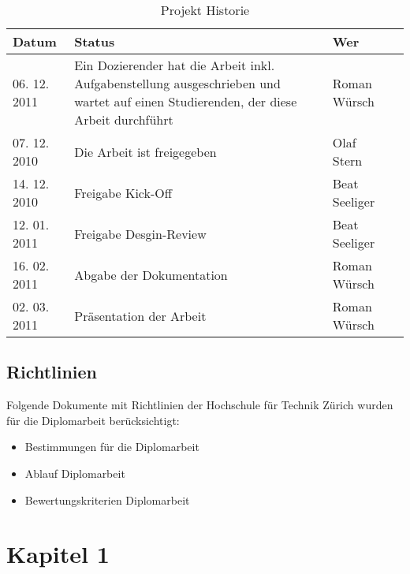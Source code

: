 \documentclass[abstracton, listof=totocnumbered,
bibliography=totocnumbered]{scrreprt}
\begin{document}
  \begin{table}[h]
    \begin{center}
      \begin{tabular}{lp{9cm}ll}
        \toprule
        Datum & Status & Wer \\
        \midrule
        06. 12. 2011 & Ein Dozierender hat die Arbeit inkl. Aufgabenstellung
        ausgeschrieben und wartet auf einen Studierenden, der diese Arbeit
        durchführt & Roman Würsch\\
        07. 12. 2010 & Die Arbeit ist freigegeben & Olaf Stern\\
        14. 12. 2010 & Freigabe Kick-Off & Beat Seeliger\\
        12. 01. 2011 & Freigabe Desgin-Review & Beat Seeliger\\
        16. 02. 2011 & Abgabe der Dokumentation & Roman Würsch\\
        02. 03. 2011 & Präsentation der Arbeit & Roman Würsch\\
        \bottomrule
      \end{tabular}
      \caption{Projekt Historie}
      \label{tab:projekthistorie}
    \end{center}
  \end{table}
  
  \section{Richtlinien}
  Folgende Dokumente mit Richtlinien der Hochschule für Technik Zürich wurden
  für die Diplomarbeit berücksichtigt:

  \begin{itemize}
      \item Bestimmungen für die Diplomarbeit \cite{hsz_reglement}
      \item Ablauf Diplomarbeit \cite{hsz_ablauf}
      \item Bewertungskriterien Diplomarbeit \cite{hsz_bewertungskriterien}
  \end{itemize} 
  
  \newpage
  
  
  \chapter{Kapitel 1}
  
\end{document}
